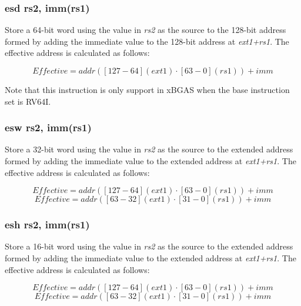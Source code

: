 \documentclass{article}
\begin{document}
\subsubsection{esd rs2, imm(rs1)}
Store a 64-bit word using the value in \textit{rs2} as the source 
to the 128-bit address formed by adding the immediate value to the 
128-bit address at \textit{ext1+rs1}.  The effective address is calculated 
as follows: 

\begin{equation}
Effective = addr([127-64](ext1) \cdot [63-0](rs1))+imm
\end{equation}

\begin{commentary}
Note that this instruction is only support in xBGAS when the base 
instruction set is RV64I.
\end{commentary}

\subsubsection{esw rs2, imm(rs1)}
Store a 32-bit word using the value in \textit{rs2} as the source 
to the extended address formed by adding the immediate value to the 
extended address at \textit{ext1+rs1}.  The effective address is calculated 
as follows: 

\begin{equation}
Effective = addr([127-64](ext1) \cdot [63-0](rs1))+imm
\end{equation}
\begin{equation}
Effective = addr([63-32](ext1) \cdot [31-0](rs1))+imm
\end{equation}

\subsubsection{esh rs2, imm(rs1)}
Store a 16-bit word using the value in \textit{rs2} as the source 
to the extended address formed by adding the immediate value to the 
extended address at \textit{ext1+rs1}.  The effective address is calculated 
as follows: 

\begin{equation}
Effective = addr([127-64](ext1) \cdot [63-0](rs1))+imm
\end{equation}
\begin{equation}
Effective = addr([63-32](ext1) \cdot [31-0](rs1))+imm
\end{equation}
\end{document}

